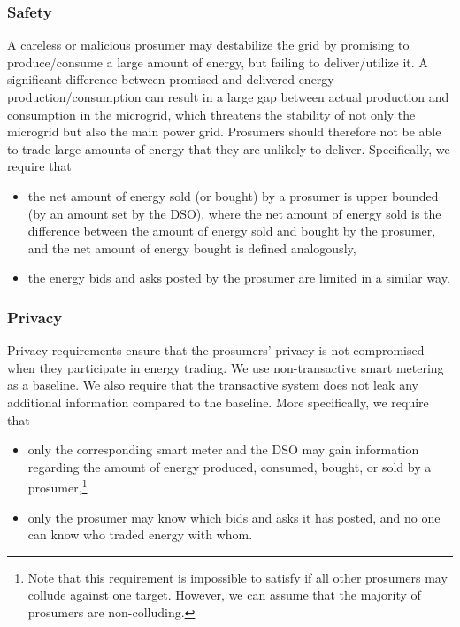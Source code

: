 \subsubsection{Safety}
A careless or malicious prosumer may destabilize the grid by promising
to produce/consume a large amount of energy, but failing to
deliver/utilize it.  A significant difference between promised and
delivered energy production/consumption can result in a large gap
between actual production and consumption in the microgrid, which
threatens the stability of not only the microgrid but also the main
power grid.  Prosumers should therefore not be able to trade large
amounts of energy that they are unlikely to deliver.
Specifically, we require that 
\begin{itemize}[noitemsep,topsep=-\parskip]
\item the net amount of energy sold (or bought) by a prosumer is upper
  bounded (by an amount set by the DSO), where the net amount of
  energy sold is the difference between the amount of energy sold and
  bought by the prosumer, and the net amount of energy bought is
  defined analogously,
\item the energy bids and asks posted by the prosumer are limited in a
  similar way.
\end{itemize}

\subsubsection{Privacy} 
Privacy requirements ensure that the prosumers' privacy is not
compromised when they participate in energy trading.  We use
non-transactive smart metering as a baseline.  We also require that
the transactive system does not leak any additional information
compared to the baseline.  More specifically, we require that
\begin{itemize}[noitemsep,topsep=-\parskip]
\item only the corresponding smart meter and the DSO may gain
  information regarding the amount of energy produced, consumed,
  bought, or sold by a prosumer,\footnote{Note that this requirement
    is impossible to satisfy if all other prosumers may collude
    against one target. However, we can assume that the majority of
    prosumers are non-colluding.}
\item only the prosumer may know which bids and asks it has posted,
  and no one can know who traded energy with whom.
\end{itemize}



